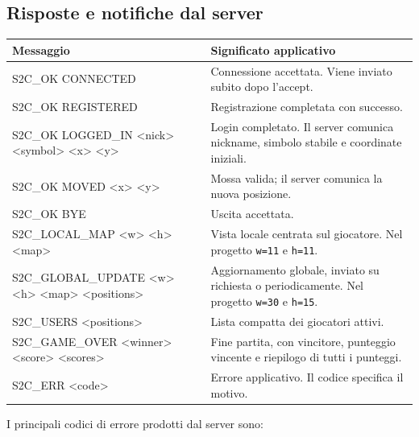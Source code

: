 \documentclass[11pt,a4paper]{article}
\begin{document}
\subsection{Risposte e notifiche dal server}

\begin{longtable}{>{\ttfamily}p{6.3cm}p{7.5cm}}
\toprule
\normalfont\textbf{Messaggio} & \textbf{Significato applicativo} \\
\midrule
\endhead

S2C\_OK CONNECTED & Connessione accettata. Viene inviato subito dopo l'accept. \\
S2C\_OK REGISTERED & Registrazione completata con successo. \\
S2C\_OK LOGGED\_IN \textless nick\textgreater{} \textless symbol\textgreater{} \textless x\textgreater{} \textless y\textgreater{} & Login completato. Il server comunica nickname, simbolo stabile e coordinate iniziali. \\
S2C\_OK MOVED \textless x\textgreater{} \textless y\textgreater{} & Mossa valida; il server comunica la nuova posizione. \\
S2C\_OK BYE & Uscita accettata. \\
S2C\_LOCAL\_MAP \textless w\textgreater{} \textless h\textgreater{} \textless map\textgreater{} & Vista locale centrata sul giocatore. Nel progetto \texttt{w=11} e \texttt{h=11}. \\
S2C\_GLOBAL\_UPDATE \textless w\textgreater{} \textless h\textgreater{} \textless map\textgreater{} \textless positions\textgreater{} & Aggiornamento globale, inviato su richiesta o periodicamente. Nel progetto \texttt{w=30} e \texttt{h=15}. \\
S2C\_USERS \textless positions\textgreater{} & Lista compatta dei giocatori attivi. \\
S2C\_GAME\_OVER \textless winner\textgreater{} \textless score\textgreater{} \textless scores\textgreater{} & Fine partita, con vincitore, punteggio vincente e riepilogo di tutti i punteggi. \\
S2C\_ERR \textless code\textgreater{} & Errore applicativo. Il codice specifica il motivo. \\

\bottomrule
\end{longtable}

I principali codici di errore prodotti dal server sono:
\end{document}
